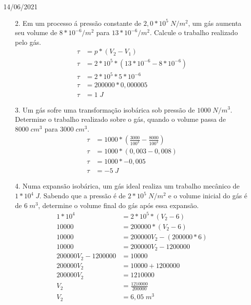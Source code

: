 \documentclass{SchoolBook}
\begin{document}
\begin{day}{14/06/2021}
\begin{enumerate}
            \item[2.] Em um processo á pressão constante de $2,0 * 10^5\;N/m^2$, um gás aumenta seu volume de $8 * 10^{-6}/m^2$ para $13 * 10^{-6}/m^2$. Calcule o trabalho realizado pelo gás.
            \begin{align*}
                \tau &= p * (V_2 - V_1) \\
                \tau &= 2 * 10^5 * (13*10^{-6} - 8*10^{-6}) \\
                \tau &= 2 * 10^5 * 5*10^{-6} \\
                \tau &= 200000 * 0,000005 \\
                \tau &= 1\;J
            \end{align*}
            
            \item[3.] Um gás sofre uma transformação isobárica sob pressão de $1000\;N/m^3$. Determine o trabalho realizado sobre o gás, quando o volume passa de $8000\;cm^3$ para $3000\;cm^3$.
            \begin{align*}
                \tau &= 1000 * (\frac{3000}{100^3} - \frac{8000}{100^3}) \\
                \tau &= 1000 * (0,003 - 0,008) \\
                \tau &= 1000 * -0,005 \\
                \tau &= -5\;J
            \end{align*}
            
            \item[4.] Numa expansão isobárica, um gás ideal realiza um trabalho mecânico de $1 * 10^4\;J$. Sabendo que a pressão é de $2 * 10^5\;N/m^2$ e o volume inicial do gás é de $6\;m^3$, determine o volume final do gás após essa expansão.
            \begin{align*}
                1*10^4 &= 2*10^5 * (V_2 - 6) \\
                10000 &= 200000 * (V_2 - 6) \\
                10000 &= 200000 V_2 - (200000 * 6) \\
                10000 &= 200000 V_2 - 1200000 \\
                200000 V_2 - 1200000 &= 10000 \\
                200000 V_2 &= 10000 + 1200000 \\
                200000 V_2 &= 1210000 \\
                V_2 &= \frac{1210000}{200000} \\
                V_2 &= 6,05\;m^3
            \end{align*}
            

\end{enumerate}
\end{day}
\end{document}

